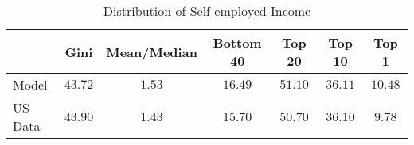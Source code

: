 \documentclass[12pt]{article}
\begin{document}
 \begin{table}[h]
 \caption{Distribution of Self-employed Income}
 \label{tab:income_se}
 \begin{center}
 \begin{tabular}{lcccccc}
 \hline 

 & Gini & Mean/Median & Bottom 40 & Top 20 & Top 10 & Top 1  \\
 \hline 

 \hline 

  Model &  $43.72$ & $ 1.53$ & $16.49$ & $51.10$ & $36.11$ & $10.48$ \\ 
  US Data &  $43.90$ & $ 1.43$ & $15.70$ & $50.70$ & $36.10$ & $ 9.78$ \\ 
 \hline
 \end{tabular}
 \end{center}
 \end{table}
\end{document}
